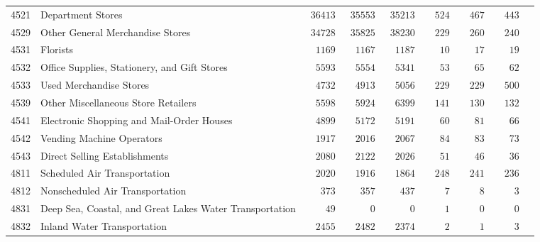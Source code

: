 \documentclass[9pt, oneside]{article}   	%
\begin{document}
\begin{longtable}{lp{3 in}ccccccc}
4521  & Department Stores & $\phantom{0}36413$ & $\phantom{0}35553$ & $\phantom{0}35213$ & $\phantom{00}524$ & $\phantom{00}467$ & $\phantom{00}443$ \\
4529  & Other General Merchandise Stores & $\phantom{0}34728$ & $\phantom{0}35825$ & $\phantom{0}38230$ & $\phantom{00}229$ & $\phantom{00}260$ & $\phantom{00}240$ \\
4531  & Florists & $\phantom{00}1169$ & $\phantom{00}1167$ & $\phantom{00}1187$ & $\phantom{000}10$ & $\phantom{000}17$ & $\phantom{000}19$ \\
4532  & Office Supplies, Stationery, and Gift Stores & $\phantom{00}5593$ & $\phantom{00}5554$ & $\phantom{00}5341$ & $\phantom{000}53$ & $\phantom{000}65$ & $\phantom{000}62$ \\
4533  & Used Merchandise Stores & $\phantom{00}4732$ & $\phantom{00}4913$ & $\phantom{00}5056$ & $\phantom{00}229$ & $\phantom{00}229$ & $\phantom{00}500$ \\
4539  & Other Miscellaneous Store Retailers & $\phantom{00}5598$ & $\phantom{00}5924$ & $\phantom{00}6399$ & $\phantom{00}141$ & $\phantom{00}130$ & $\phantom{00}132$ \\
4541  & Electronic Shopping and Mail-Order Houses & $\phantom{00}4899$ & $\phantom{00}5172$ & $\phantom{00}5191$ & $\phantom{000}60$ & $\phantom{000}81$ & $\phantom{000}66$ \\
4542  & Vending Machine Operators & $\phantom{00}1917$ & $\phantom{00}2016$ & $\phantom{00}2067$ & $\phantom{000}84$ & $\phantom{000}83$ & $\phantom{000}73$ \\
4543  & Direct Selling Establishments & $\phantom{00}2080$ & $\phantom{00}2122$ & $\phantom{00}2026$ & $\phantom{000}51$ & $\phantom{000}46$ & $\phantom{000}36$ \\
4811  & Scheduled Air Transportation & $\phantom{00}2020$ & $\phantom{00}1916$ & $\phantom{00}1864$ & $\phantom{00}248$ & $\phantom{00}241$ & $\phantom{00}236$ \\
4812  & Nonscheduled Air Transportation & $\phantom{000}373$ & $\phantom{000}357$ & $\phantom{000}437$ & $\phantom{0000}7$ & $\phantom{0000}8$ & $\phantom{0000}3$ \\
4831  & Deep Sea, Coastal, and Great Lakes Water Transportation & $\phantom{0000}49$ & $\phantom{00000}0$ & $\phantom{00000}0$ & $\phantom{0000}1$ & $\phantom{0000}0$ & $\phantom{0000}0$ \\
4832  & Inland Water Transportation & $\phantom{00}2455$ & $\phantom{00}2482$ & $\phantom{00}2374$ & $\phantom{0000}2$ & $\phantom{0000}1$ & $\phantom{0000}3$ \\


\end{longtable}
\end{document}
